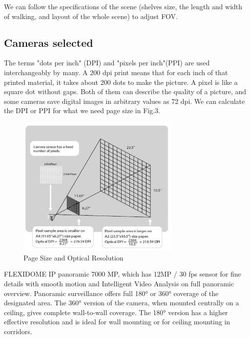 We can follow the specifications of the scene (shelves size, the length and width of walking, and layout of the whole scene) to adjust FOV.

\subsection{Cameras selected}

The terms "dots per inch" (DPI) and "pixels per inch"(PPI) are used interchangeably by many. A 200 dpi print means that for each inch of that printed material, it takes about 200 dots to make the picture. A pixel is like a square dot without gaps. Both of them can describe the quality of a picture, and some cameras save digital images in arbitrary values as 72 dpi. We can calculate the DPI or PPI for what we need page size in Fig.3.
\begin{figure}[htbp]
\centerline{\includegraphics[width=8cm,scale=0.9]{DPIPPI.jpg}}
\caption{Page Size and Optical Resolution}
\label{fig}
\end{figure}

FLEXIDOME IP panoramic 7000 MP, which has 12MP / 30 fps sensor for fine details with smooth motion and Intelligent Video Analysis on full panoramic overview. Panoramic surveillance offers full 180° or 360° coverage of the designated area. The 360° version of the camera, when mounted
centrally on a ceiling, gives complete wall-to-wall coverage. The 180° version has a higher effective resolution and is ideal for wall mounting or for ceiling
mounting in corridors.

